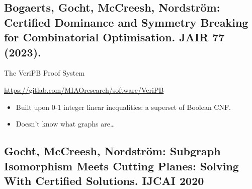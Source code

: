 \documentclass[aspectratio=169,compress,10pt]{beamer}
\begin{document}
\subsection{Bogaerts, Gocht, McCreesh, Nordstr\"om: Certified Dominance and Symmetry Breaking for
Combinatorial Optimisation. JAIR 77 (2023).}

\begin{frame}{The VeriPB Proof System}
    \begin{center}
        \url{https://gitlab.com/MIAOresearch/software/VeriPB}
    \end{center}

    \bigskip

    \begin{itemize}
        \item Built upon 0-1 integer linear inequalities: a superset of Boolean CNF.
        \item Doesn't know what graphs are\ldots
    \end{itemize}
\end{frame}

\subsection{Gocht, McCreesh, Nordstr\"om: Subgraph Isomorphism Meets Cutting Planes: Solving With Certified Solutions. IJCAI 2020}
\end{document}
